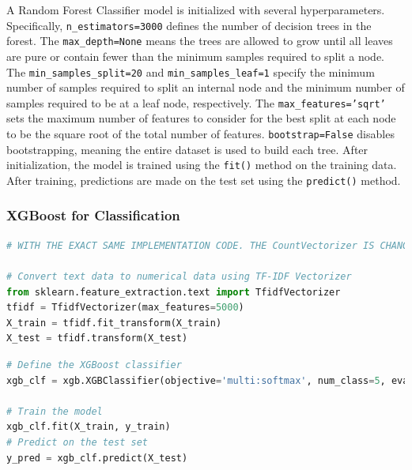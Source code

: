 \noindent
 A Random Forest Classifier model is initialized with several hyperparameters. Specifically, \texttt{n\_estimators=3000} defines the number of decision trees in the forest. The \texttt{max\_depth=None} means the trees are allowed to grow until all leaves are pure or contain fewer than the minimum samples required to split a node. The \texttt{min\_samples\_split=20} and \texttt{min\_samples\_leaf=1} specify the minimum number of samples required to split an internal node and the minimum number of samples required to be at a leaf node, respectively. The \texttt{max\_features='sqrt'} sets the maximum number of features to consider for the best split at each node to be the square root of the total number of features. \texttt{bootstrap=False} disables bootstrapping, meaning the entire dataset is used to build each tree. After initialization, the model is trained using the \texttt{fit()} method on the training data. After training, predictions are made on the test set using the \texttt{predict()} method.



\subsubsection{XGBoost for Classification}

\begin{tcolorbox}[colback=gray!5!white, colframe=gray!80!black, boxrule=0.5pt, title=XGBoost Classifier Implementation]
    \begin{lstlisting}[language=Python]
# WITH THE EXACT SAME IMPLEMENTATION CODE. THE CountVectorizer IS CHANGED TO TF-IDF

# Convert text data to numerical data using TF-IDF Vectorizer
from sklearn.feature_extraction.text import TfidfVectorizer
tfidf = TfidfVectorizer(max_features=5000)
X_train = tfidf.fit_transform(X_train)
X_test = tfidf.transform(X_test)
\end{lstlisting}
\end{tcolorbox}
\begin{tcolorbox}[colback=gray!5!white, colframe=gray!80!black, boxrule=0.5pt, title=XGBoost Classifier Implementation]
    \begin{lstlisting}[language=Python]
# Define the XGBoost classifier
xgb_clf = xgb.XGBClassifier(objective='multi:softmax', num_class=5, eval_metric='mlogloss', use_label_encoder=False)

# Train the model
xgb_clf.fit(X_train, y_train)
# Predict on the test set
y_pred = xgb_clf.predict(X_test)
\end{lstlisting}
\end{tcolorbox}

